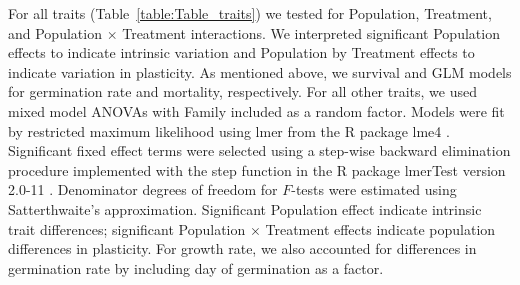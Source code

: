 \documentclass[11pt, oneside]{article}\usepackage[]{graphicx}\usepackage[]{color}
\newcommand{\pkg}[1]{{\fontseries{b}\selectfont #1}}
\begin{document}
For all traits (Table~\ref{table:Table_traits}) we tested for Population, Treatment, and Population $\times$ Treatment interactions. We interpreted significant Population effects to indicate intrinsic variation and Population by Treatment effects to indicate variation in plasticity. As mentioned above, we survival and GLM models for germination rate and mortality, respectively. For all other traits, we used mixed model ANOVAs with Family included as a random factor. Models were fit by restricted maximum likelihood using lmer from the R package \pkg{lme4} \citep{Bates_etal_2014}. Significant fixed effect terms were selected using a step-wise backward elimination procedure implemented with the step function in the R package \pkg{lmerTest} version 2.0-11 \citep{Kuznetsova_etal_2014}. Denominator degrees of freedom for $F$-tests were estimated using Satterthwaite's approximation. Significant Population effect indicate intrinsic trait differences; significant Population $\times$ Treatment effects indicate population differences in plasticity. For growth rate, we also accounted for differences in germination rate by including day of germination as a factor.
\end{document}
